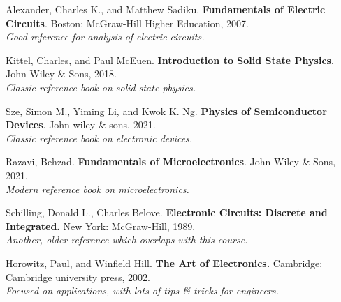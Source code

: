 \documentclass[a4paper,11pt]{book}
\begin{document}
\begin{thebibliography}{9}
	Alexander, Charles K., and Matthew Sadiku. \textbf{Fundamentals of Electric Circuits}. Boston: McGraw-Hill Higher Education, 2007.\\
	\emph{Good reference for analysis of electric circuits.}
	
	Kittel, Charles, and Paul McEuen. \textbf{Introduction to Solid State Physics}. John Wiley \& Sons, 2018.\\
	\emph{Classic reference book on solid-state physics.}
	
	Sze, Simon M., Yiming Li, and Kwok K. Ng. \textbf{Physics of Semiconductor Devices}. John wiley \& sons, 2021.\\
	\emph{Classic reference book on electronic devices.}
	
	Razavi, Behzad. \textbf{Fundamentals of Microelectronics}. John Wiley \& Sons, 2021.\\
	\emph{Modern reference book on microelectronics.}
	
	Schilling, Donald L., Charles Belove. \textbf{Electronic Circuits: Discrete and Integrated.} New York: McGraw-Hill, 1989.\\
	\emph{Another, older reference which overlaps with this course.}
	
	Horowitz, Paul, and Winfield Hill. \textbf{The Art of Electronics.} Cambridge: Cambridge university press, 2002.\\
	\emph{Focused on applications, with lots of tips \& tricks for engineers.}
	
\end{thebibliography}


\end{document}

